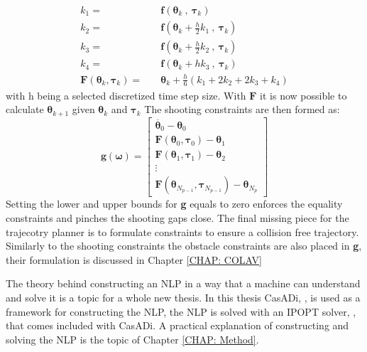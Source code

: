 \begin{equation}
    \label{EQ: RK4}
    \begin{split}
    k_1 = \quad & \textbf{f}(\bm{\theta}_{k} \ , \ \bm{\tau}_k) \\
    k_2 = \quad & \textbf{f}(\bm{\theta}_{k} + \frac{h}{2}k_1 \ , \ \bm{\tau}_k) \\
    k_3 = \quad & \textbf{f}(\bm{\theta}_{k} + \frac{h}{2}k_2 \ , \ \bm{\tau}_k) \\ 
    k_4 = \quad & \textbf{f}(\bm{\theta}_{k} + h k_3 \ , \ \bm{\tau}_k) \\ 
    \textbf{F}(\bm{\theta}_{k}, \bm{\tau}_k) = \quad & \bm{\theta}_k + \frac{h}{6} (k_1 + 2k_2 + 2k_3 + k_4)
    \end{split}
\end{equation}
with h being a selected discretized time step size. With $\textbf{F}$ it is now possible to calculate $\bm{\theta}_{k+1}$ given $\bm{\theta}_k$ and $\bm{\tau}_k$
The shooting constraints are then formed as:
\begin{equation}
    \textbf{g}(\bm{\omega}) = \begin{bmatrix}
                            \overline{\bm{\theta}}_0 - \bm{\theta}_0 \\[-5pt]
                            \textbf{F}(\bm{\theta}_{0}, \bm{\tau}_0) - \bm{\theta}_1 \\[-5pt]
                            \textbf{F}(\bm{\theta}_{1}, \bm{\tau}_1) - \bm{\theta}_2 \\[-5pt]
                            \vdots \\[-5pt]
                            \textbf{F}(\bm{\theta}_{N_{p-1}}, \bm{\tau}_{N_{p-1}}) - \bm{\theta}_{N_{p}}
                             \end{bmatrix}
\end{equation}
Setting the lower and upper bounds for \textbf{g} equals to zero enforces the equality constraints and pinches the shooting gaps close. The final missing piece for the trajecotry planner
is to formulate constraints to ensure a collision free trajectory. Similarly to the shooting constraints the obstacle constraints are also placed in \textbf{g}, their
formulation is discussed in Chapter \ref{CHAP: COLAV}

The theory behind constructing an \gls{NLP} in a way that a machine can understand and solve it is a topic for a whole new thesis. In this thesis CasADi, \cite{andersson2019casadi}, is used
as a framework for constructing the NLP, the NLP is solved with an \gls{IPOPT} solver, \cite{wachter2006implementation}, that comes included with CasADi. A practical
explanation of constructing and solving the NLP is the topic of Chapter \ref{CHAP: Method}.

